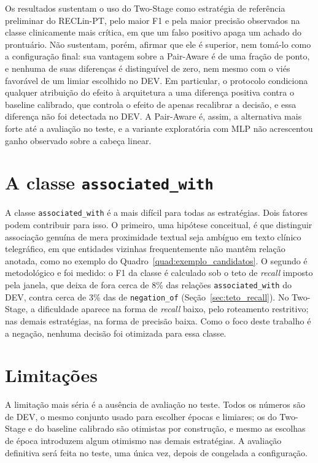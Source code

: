 Os resultados sustentam o uso do Two-Stage como estratégia de referência preliminar
do RECLin-PT, pelo maior F1 e pela maior precisão observados na classe clinicamente
mais crítica, em que um falso positivo apaga um achado do prontuário. Não sustentam,
porém, afirmar que ele é superior, nem tomá-lo como a configuração final: sua vantagem sobre a Pair-Aware é de uma fração
de ponto, e nenhuma de suas diferenças é distinguível de zero, nem mesmo com o viés
favorável de um limiar escolhido no DEV. Em particular, o protocolo condiciona
qualquer atribuição do efeito à arquitetura a uma diferença positiva contra o
baseline calibrado, que controla o efeito de apenas recalibrar a decisão, e
essa diferença não foi detectada no DEV. A Pair-Aware é, assim, a alternativa mais
forte até a avaliação no teste, e a variante exploratória com MLP não acrescentou
ganho observado sobre a cabeça linear.

\section{A classe \texttt{associated\_with}}

A classe \texttt{associated\_with} é a mais difícil para todas as estratégias. Dois
fatores podem contribuir para isso. O primeiro, uma hipótese conceitual, é que
distinguir associação genuína de mera proximidade textual seja ambíguo em texto
clínico telegráfico, em que entidades vizinhas frequentemente não mantêm relação
anotada, como no exemplo do Quadro~\ref{quad:exemplo_candidatos}. O segundo é
metodológico e foi medido: o F1 da classe é calculado sob o teto de \emph{recall} imposto pela janela, que deixa de fora
cerca de 8\% das relações \texttt{associated\_with} do DEV, contra cerca de 3\% das
de \texttt{negation\_of} (Seção~\ref{sec:teto_recall}). No Two-Stage, a
dificuldade aparece na forma de \emph{recall} baixo, pelo roteamento restritivo; nas
demais estratégias, na forma de precisão baixa. Como o foco deste trabalho é a
negação, nenhuma decisão foi otimizada para essa classe.

\section{Limitações}
\label{sec:limitacoes}

A limitação mais séria é a ausência de avaliação no teste. Todos os
números são de DEV, o mesmo conjunto usado para escolher épocas e limiares; os do
Two-Stage e do baseline calibrado são otimistas por construção, e mesmo as escolhas
de época introduzem algum otimismo nas demais estratégias. A avaliação definitiva
será feita no teste, uma única vez, depois de congelada a configuração.

